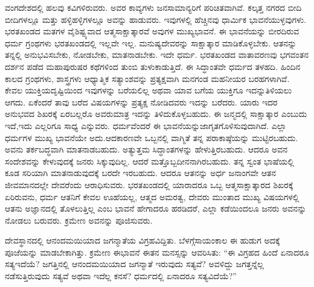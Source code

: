ವಂಗದೇಶದಲ್ಲಿ ಹಲವು ಕವಿಗಳಿರುವರು. ಅವರ ಕಾವ್ಯಗಳು ಜನಸಾಮಾನ್ಯರಿಗೆ ಪರಿಚಿತವಾಗಿವೆ. ಕಲ್ಕತ್ತ ನಗರದ ಬೀದಿ ಬೀದಿಗಳಲ್ಲೂ ಮತ್ತು ಹಳ್ಳಿಹಳ್ಳಿಗಳಲ್ಲೂ ಅವನ್ನು ಹಾಡುವರು. ಇವುಗಳಲ್ಲಿ ಹೆಚ್ಚಿನವು ಧಾರ್ಮಿಕ ಭಾವನೆಯುಳ್ಳವುಗಳು. ಭರತಖಂಡದ ಮತಗಳ ವೈಶಿಷ್ಟ್ಯವಾದ ಆತ್ಮಸಾಕ್ಷಾತ್ಕಾರವೆ ಅವುಗಳ ಮುಖ್ಯಭಾವನೆ. ಈ ಭಾವನೆಯನ್ನು ಬೀರದಿರುವ ಧರ್ಮ ಗ್ರಂಥಗಳು ಭರತಖಂಡದಲ್ಲಿ ಇಲ್ಲವೇ ಇಲ್ಲ. ಮನುಷ್ಯ\break ದೇವರನ್ನು ಸಾಕ್ಷಾತ್ಕಾರ ಮಾಡಿಕೊಳ್ಳಬೇಕು. ಆತನನ್ನು ತನ್ನಲ್ಲಿ ಅನುಭವಿಸಬೇಕು, ನೋಡಬೇಕು, ಮಾತನಾಡಬೇಕು. ಇದೇ ಧರ್ಮ. ಭರತಖಂಡದ ವಾತಾವರಣವು ಭಗವಂತನ ದರ್ಶನ ಪಡೆದ ಮಹಾಪುರುಷರ ಕಥೆಗಳಿಂದ ತುಂಬಿ ತುಳುಕಾಡುತ್ತಿದೆ. ಈ ಸಿದ್ಧಾಂತವೇ ಧರ್ಮದ ತಳಹದಿ. ಹಿಂದಿನ ಕಾಲದ ಗ್ರಂಥಗಳು, ಶಾಸ್ತ್ರಗಳು ಆಧ್ಯಾತ್ಮಿಕ ಸತ್ಯಾಂಶವನ್ನು ಪ್ರತ್ಯಕ್ಷವಾಗಿ ಮನಗಂಡ ಮಹನೀಯರ ಬರಹಗಳಾಗಿವೆ. ಕೇವಲ ಯುಕ್ತಿಯ\break ದೃಷ್ಟಿಯಿಂದ ಇವುಗಳನ್ನು ಬರೆಯಲಿಲ್ಲ ಅಥವಾ ಯಾವ ಬಗೆಯ ಯುಕ್ತಿಗೂ ಇದನ್ನು\break ತಿಳಿಯಲು ಆಗದು. ಏಕೆಂದರೆ ತಾವು ಬರೆದ ವಿಷಯಗಳನ್ನು ಪ್ರತ್ಯಕ್ಷ ನೋಡಿದವರು ಇದನ್ನು ಬರೆದರು. ಯಾರು ಇದರ ಅನುಭವದ ಶಿಖರಕ್ಕೆ ಏರಬಲ್ಲರೊ ಅವರು\break ಮಾತ್ರ ಇದನ್ನು ತಿಳಿದುಕೊಳ್ಳಬಹುದು. ಈ ಜನ್ಮದಲ್ಲಿ ಸಾಕ್ಷಾತ್ಕಾರ ಎಂಬುದು ಇದೆ,\break ಇದು ಎಲ್ಲರಿಗೂ ಸಾಧ್ಯ ಎನ್ನುವರು. ಧರ್ಮವೆಂದರೆ ಈ ಭಾವನೆಯನ್ನು\break ಜಾಗೃತಗೊಳಿಸುವುದಾಗಿದೆ. ಎಲ್ಲಾ ಧರ್ಮಗಳ ಮುಖ್ಯ ಭಾವನೆಯೇ ಅದು.\break ಆದಕಾರಣವೇ ಒಬ್ಬನಲ್ಲಿ ವಾಗ್ಮಿತೆ ತನ್ನ ಪರಾಕಾಷ್ಠೆಯನ್ನು ಮುಟ್ಟಿರಬಹುದು. ಅವನು ತರ್ಕಬದ್ಧವಾಗಿ ಮಾತನಾಡಬಹುದು. ಅತ್ಯುತ್ತಮ ಸಿದ್ಧಾಂತಗಳನ್ನು ಹೇಳುತ್ತಿರಬಹುದು. ಆದರೂ ಅವನ ಸಂದೇಶವನ್ನು ಕೇಳುವುದಕ್ಕೆ ಜನರು ಸಿಕ್ಕುವುದಿಲ್ಲ. ಆದರೆ ಮತ್ತೊಬ್ಬ\break ದೀನನಾಗಿರಬಹುದು. ತನ್ನ ಸ್ವಂತ ಭಾಷೆಯಲ್ಲಿ ಕೂಡ ಸರಿಯಾಗಿ ಮಾತನಾಡುವುದಕ್ಕೆ ಬರದೇ ಇರಬಹುದು. ಆದರೂ ಆತನನ್ನು ಅರ್ಧ ಜನಾಂಗವೇ ಆತನ ಜೀವಮಾನದಲ್ಲೇ ದೇವರೆಂದು ಆರಾಧಿಸುವರು. ಭರತಖಂಡದಲ್ಲಿ ಯಾರಾದರೂ ಒಬ್ಬ ಆತ್ಮಸಾಕ್ಷಾತ್ಕಾರದ ಶಿಖರಕ್ಕೆ ಏರಿರುವನು, ಧರ್ಮ ಆತನಿಗೆ ಕೇವಲ ಊಹೆಯಲ್ಲ, ಆತ್ಮದ ಅಮರತ್ವ, ದೇವರು ಮುಂತಾದ ಮುಖ್ಯ ವಿಷಯಗಳಲ್ಲಿ ಆತನು ಅಜ್ಞಾನದಲ್ಲಿ ತೊಳಲುತ್ತಿಲ್ಲ ಎಂಬ ಭಾವನೆ ಹೇಗಾದರೂ ಹರಡಿದರೆ, ಎಲ್ಲಾ ಕಡೆಯಿಂದಲೂ ಜನರು ಅವನನ್ನು ನೋಡಲು ಬರುವರು. ಕ್ರಮೇಣ ಅವನನ್ನು ಪೂಜಿಸುವರು.

ದೇವಸ್ಥಾನದಲ್ಲಿ ಆನಂದಮಯಿಯಾದ ಜಗನ್ಮಾತೆಯ ವಿಗ್ರಹವಿದ್ದಿತು. ಬೆಳಗ್ಗೆ\break ಸಾಯಂಕಾಲ ಈ ಹುಡುಗ ಅದಕ್ಕೆ ಪೂಜೆಯನ್ನು ಮಾಡಬೇಕಾಗಿತ್ತು. ಕ್ರಮೇಣ ಈ\break ಭಾವನೆ ಈತನ ಮನಸ್ಸನ್ನು ಆವರಿಸಿತು: “ಈ ವಿಗ್ರಹದ ಹಿಂದೆ ಏನಾದರೂ ಸತ್ಯ\break ಇದೆಯೆ? ಜಗತ್ತಿನಲ್ಲಿ ಆನಂದಮಯಿಯಾದ ಜಗನ್ಮಾತೆ ಇರುವುದು ಸತ್ಯವೆ? ಅವಳಿದ್ದು ಜಗತ್ತನ್ನೆಲ್ಲ ನಡೆಸುತ್ತಿರುವುದು ಸತ್ಯವೆ ಅಥವಾ ಇದೆಲ್ಲ ಕನಸೆ? ಧರ್ಮದಲ್ಲಿ ಏನಾದರೂ ಸತ್ಯವಿದೆಯೆ?”

